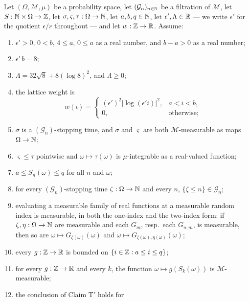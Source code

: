 \begin{lemma}
Let $(\Omega,\mathcal M,\mu)$ be a probability space, let
$(\mathcal G_n)_{n\in\mathbb{N}}$ be a filtration of $\mathcal M$, let
$S:\mathbb{N}\times\Omega\to\mathbb{Z}$, let $\sigma,\varsigma,\tau:\Omega\to\mathbb{N}$, let
$a,b,q\in\mathbb{N}$, let $\epsilon',\Lambda\in\mathbb{R}$ --- we write $\epsilon'$ for the
quotient $\epsilon/r$ throughout --- and let $w:\mathbb{Z}\to\mathbb{R}$. Assume:
\begin{enumerate}
\item\label{it:lgsb-eps} $\epsilon'>0$, $0<b$, $4\le a$, $0\le a$ as a real
number, and $b-a>0$ as a real number;
\item\label{it:lgsb-scale} $\epsilon'\,b=8$;
\item\label{it:lgsb-Lam} $\Lambda=32\sqrt8+8(\log 8)^2$, and $\Lambda\ge0$;
\item\label{it:lgsb-w} the lattice weight is
\[
  w(i)=\begin{cases}
    (\epsilon')^2\bigl|\log(\epsilon' i)\bigr|^2, & a<i<b,\\
    0, & \text{otherwise};
  \end{cases}
\]
\item\label{it:lgsb-st} $\sigma$ is a $(\mathcal G_n)$-stopping time, and
$\sigma$ and $\varsigma$ are both $\mathcal M$-measurable as maps
$\Omega\to\mathbb{N}$;
\item\label{it:lgsb-tau} $\varsigma\le\tau$ pointwise and
$\omega\mapsto\tau(\omega)$ is $\mu$-integrable as a real-valued function;
\item\label{it:lgsb-range} $a\le S_n(\omega)\le q$ for all $n$ and $\omega$;
\item\label{it:lgsb-stG} for every $(\mathcal G_n)$-stopping time
$\zeta:\Omega\to\mathbb{N}$ and every $n$, $\{\zeta\le n\}\in\mathcal G_n$;
\item\label{it:lgsb-idx} evaluating a measurable family of real functions at a
measurable random index is measurable, in both the one-index and the two-index
form: if $\zeta,\eta:\Omega\to\mathbb{N}$ are measurable and each $G_m$, resp.\ each
$G_{n,m}$, is measurable, then so are $\omega\mapsto G_{\zeta(\omega)}(\omega)$
and $\omega\mapsto G_{\zeta(\omega),\eta(\omega)}(\omega)$;
\item\label{it:lgsb-bdd} every $g:\mathbb{Z}\to\mathbb{R}$ is bounded on
$\{i\in\mathbb{Z}:a\le i\le q\}$;
\item\label{it:lgsb-gS} for every $g:\mathbb{Z}\to\mathbb{R}$ and every $k$, the function
$\omega\mapsto g(S_k(\omega))$ is $\mathcal M$-measurable;
\item\label{it:lgsb-claimT} the conclusion of Claim T$'$ holds for

\end{enumerate}
\end{lemma}
